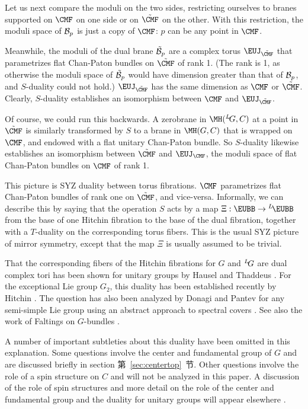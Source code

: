 Let us next compare the moduli on the two sides, restricting
ourselves to branes supported on ${\CMF}$ on one side or on
$\tilde {\CMF}$ on the other. With this restriction, the moduli
space of ${\cal B}_p$ is just a copy of ${\CMF}$: $p$ can be any
point in ${\CMF}$.

Meanwhile, the moduli of the dual brane $\tilde{\cal B}_p$ are a
complex torus  ${\EUJ}_{\tilde {\CMF}}$ that parametrizes flat
Chan-Paton bundles on $\tilde {\CMF}$ of rank 1. (The rank is 1,
as otherwise the moduli space of $\tilde{\cal B}_p$ would have
dimension greater than that of ${\cal B}_p$, and $S$-duality could
not hold.) ${\EUJ}_{\tilde {\CMF}}$ has the same dimension as
${\CMF}$ or $\tilde {\CMF}$. Clearly, $S$-duality establishes an
isomorphism between ${\CMF}$ and ${\EUJ}_{\tilde {\CMF}}$.

Of course, we could run this backwards.  A zerobrane in
$\MH(^L\negthinspace G,C)$ at a point in $\tilde {\CMF}$ is
similarly transformed by $S$ to a brane in $\MH(G,C)$ that is
wrapped on ${\CMF}$, and endowed with a flat unitary Chan-Paton
bundle. So $S$-duality likewise establishes an isomorphism between
$\tilde {\CMF}$ and ${\EUJ}_{\CMF}$, the moduli space of flat
Chan-Paton bundles on ${\CMF}$ of rank 1.

This picture is  SYZ duality between torus fibrations.  ${\CMF}$
parametrizes flat Chan-Paton bundles of rank one on $\tilde
{\CMF}$, and vice-versa.  Informally, we can describe this by
saying that the operation $S$ acts by a map
$\Xi:{\EUBB}\to{}^L\negthinspace{\EUBB}$ from the base of one
Hitchin fibration to the base of the dual fibration, together with
a $T$-duality on the corresponding torus fibers. This is the usual
SYZ picture of mirror symmetry, except that the map $\Xi$ is
usually assumed to be trivial.

That the corresponding fibers of the Hitchin fibrations for $G$
and $^L\negthinspace G$ are dual complex tori has been shown for
unitary groups by Hausel and Thaddeus \cite{ref21}. For the
exceptional Lie group $G_2$, this duality has been established
recently by Hitchin \cite{ref81}.  The
question has also been analyzed by Donagi and Pantev for any
semi-simple Lie group using an abstract approach to spectral
covers \cite{ref82}.  See also the work of Faltings
on $G$-bundles
\cite{ref83}.

A number of important subtleties about this duality have been
omitted in this explanation. Some questions involve the center and
fundamental group of $G$ and are discussed briefly in section
第~\ref{sec:centertop}~节. Other questions involve the role of a spin structure
on $C$ and will not be analyzed in this paper.  A discussion of
the role of spin structures and more detail on the role of the
center and fundamental group and the duality for unitary groups
will appear elsewhere \cite{ref26}.

